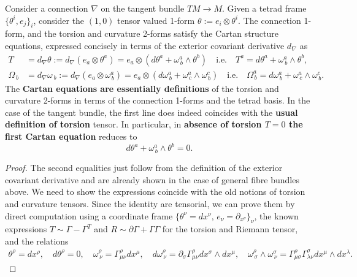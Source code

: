 \documentclass[../geometry_main.tex]{subfiles}
\begin{document}
\begin{mytheorem}
%
Consider a connection $\nabla$ on the tangent bundle $TM \to M$.
Given a tetrad frame $\{\theta^i,e_j\}_i$, consider the $(1,0)$ tensor valued 1-form $\theta :=  e_i \otimes \theta^i$.
The connection 1-form, and the torsion and curvature 2-forms satisfy the Cartan structure equations, expressed concisely in terms of the exterior covariant derivative $d_\nabla$ as
\begin{align}
    T &= d_\nabla \theta := d_\nabla (e_a\otimes \theta^a)= e_a \otimes \left(d \theta^a + \omega^a_{\, b} \wedge \theta^b \right) 
    \quad \text{i.e.} \quad T^a = d \theta^a + \omega^a_{\, b} \wedge \theta^b,
    \\
    \Omega_{\, b} &= d_\nabla \omega_{\, b}:=d_\nabla (e_a \otimes \omega^a_{\, b}) = e_a \otimes \left(d \omega^a_{\, b} + \omega^a_{\,c} \wedge \omega^c_{\, b}\right) 
    \quad\text{i.e.} \quad \Omega^a_{\, b} = d \omega^a_{\, b} + \omega^a_{\, c} \wedge \omega^c_{\, b}.
\end{align}
The \textbf{Cartan equations are essentially definitions} of the torsion and curvature 2-forms in terms of the connection 1-forms and the tetrad basis.
In the case of the tangent bundle, the first line does indeed coincides with the \textbf{usual definition of torsion} tensor.
In particular, in \textbf{absence of torsion $T=0$ the first Cartan equation} reduces to
\begin{equation}
    d \theta^a + \omega^a_{\, b} \wedge \theta^b = 0.
\end{equation}
\end{mytheorem}
\vspace{-4mm}
\begin{proof}
The second equalities just follow from the definition of the exterior covariant derivative and are already shown in the case of general fibre bundles above.
We need to show the expressions coincide with the old notions of torsion and curvature tensors.
Since the identity are tensorial, we can prove them by direct computation using a coordinate frame $\{\theta^\nu=dx^\nu,\, e_\nu=\partial_{x^\nu}\}_\nu$, the known expressions $T\sim \Gamma - \Gamma^T$ and $R\sim \partial \Gamma + \Gamma \Gamma$ for the torsion and Riemann tensor, and the relations
\begin{align}
    \theta^\rho = dx^\rho,\quad d\theta^\rho = 0,\quad
    \omega^\rho_{\, \nu} = \Gamma^\rho_{\mu \nu} dx^\mu,
    \quad
    d \omega^\rho_{\, \nu} = \partial_\sigma \Gamma^\rho_{\mu \nu} dx^\sigma \wedge dx^\mu,
    \quad
    \omega^\rho_{\, \sigma} \wedge \omega^\sigma_{\, \nu} = \Gamma^\rho_{\mu \sigma} \Gamma^\sigma_{\lambda \nu} dx^\mu \wedge dx^\lambda.
\end{align}
%
\end{proof}
\end{document}
